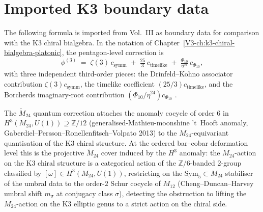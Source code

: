 \section{Imported K3 boundary data}
\label{sec:qc-supplement}

\begin{remark}
\label{rem:qc-1}
The following formula is imported from Vol.~III as boundary data for
comparison with the K3 chiral bialgebra.  In the notation of
Chapter~\ref{V3-ch:k3-chiral-bialgebra-platonic}, the pentagon-level
correction is
\[
 \phi^{(3)}
 \;=\;
 \zeta(3)\, c_{\mathrm{symm}}
 \;+\;
 \tfrac{25}{3}\, c_{\mathrm{timelike}}
 \;+\;
 \tfrac{\Phi_{10}}{\eta^{24}}\, c_{\Phi_{10}},
\]
with three independent third-order pieces: the Drinfeld--Kohno
associator contribution $\zeta(3)c_{\mathrm{symm}}$, the timelike
coefficient $(25/3)c_{\mathrm{timelike}}$, and the Borcherds
imaginary-root contribution
$(\Phi_{10}/\eta^{24})c_{\Phi_{10}}$
\cite{Drinfeld1990,Borcherds1992,GritsenkoNikulin1998}.
\end{remark}

\begin{remark}
\label{rem:qc-2}
The $\widetilde M_{24}$ quantum correction attaches the anomaly
cocycle of order $6$ in $H^3(M_{24}, U(1)) \supseteq \mathbb Z/12$
(generalised-Mathieu-moonshine 't~Hooft anomaly,
Gaberdiel--Persson--Ronellenfitsch--Volpato 2013) to the
$M_{24}$-equivariant quantisation of the K3 chiral structure. At the
ordered bar--cobar deformation level this is the projective
$\widetilde M_{24}$ cover induced by the $H^3$ anomaly: the
$M_{24}$-action on the K3 chiral structure is a categorical action
of the $\mathbb Z/6$-banded $2$-group classified by $[\omega] \in
H^3(M_{24}, U(1))$, restricting on the $\mathrm{Sym}_5 \subset M_{24}$
stabiliser of the umbral data to the order-$2$ Schur cocycle of
$M_{12}$ (Cheng--Duncan--Harvey~\cite{ChengDuncanHarvey2014} umbral
shift $m_\sigma$ at conjugacy class $\sigma$), detecting the obstruction
to lifting the $M_{24}$-action on the K3 elliptic genus to a strict
action on the chiral side.
\end{remark}

